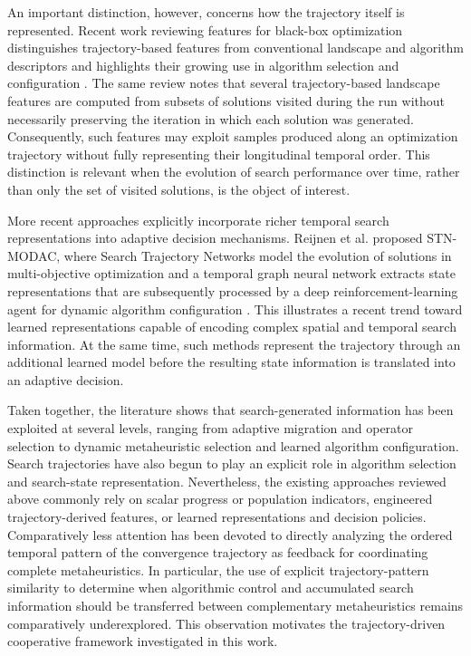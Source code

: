 \documentclass[review]{elsarticle}
\begin{document}
An important distinction, however, concerns how the trajectory itself is
represented. Recent work reviewing features for black-box optimization
distinguishes trajectory-based features from conventional landscape and
algorithm descriptors and highlights their growing use in algorithm
selection and configuration \cite{cenikj2026survey}. The same review notes
that several trajectory-based landscape features are computed from subsets
of solutions visited during the run without necessarily preserving the
iteration in which each solution was generated. Consequently, such features
may exploit samples produced along an optimization trajectory without fully
representing their longitudinal temporal order. This distinction is relevant
when the evolution of search performance over time, rather than only the set
of visited solutions, is the object of interest.

More recent approaches explicitly incorporate richer temporal search
representations into adaptive decision mechanisms. Reijnen et al. proposed
STN-MODAC, where Search Trajectory Networks model the evolution of solutions
in multi-objective optimization and a temporal graph neural network extracts
state representations that are subsequently processed by a deep
reinforcement-learning agent for dynamic algorithm configuration
\cite{reijnen2025search}. This illustrates a recent trend toward learned
representations capable of encoding complex spatial and temporal search
information. At the same time, such methods represent the trajectory through
an additional learned model before the resulting state information is
translated into an adaptive decision.

Taken together, the literature shows that search-generated information has
been exploited at several levels, ranging from adaptive migration and
operator selection to dynamic metaheuristic selection and learned algorithm
configuration. Search trajectories have also begun to play an explicit role
in algorithm selection and search-state representation. Nevertheless, the
existing approaches reviewed above commonly rely on scalar progress or
population indicators, engineered trajectory-derived features, or learned
representations and decision policies. Comparatively less attention has
been devoted to directly analyzing the ordered temporal pattern of the
convergence trajectory as feedback for coordinating complete
metaheuristics. In particular, the use of explicit trajectory-pattern
similarity to determine when algorithmic control and accumulated search
information should be transferred between complementary metaheuristics
remains comparatively underexplored. This observation motivates the
trajectory-driven cooperative framework investigated in this work.
\end{document}
